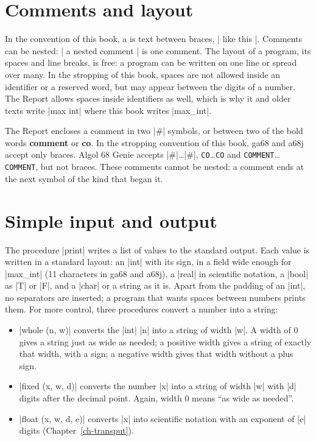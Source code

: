 \section{Comments and layout}\label{sec-comments}

In the convention of this book, a  is text between
braces, \code|{ like this }|. Comments can be nested: \code|{ a { nested } comment }| is one comment. The
layout of a program, its spaces and line breaks, is free: a program can be
written on one line or spread over many. In the stropping of this book,
spaces are not allowed inside an identifier or a reserved word, but may
appear between the digits of a number. The Report allows spaces inside
identifiers as well, which is why it and older texts write
\code|max int| where this book writes \code|max_int|.

\begin{implnote}
The Report encloses a comment in two \code|#| symbols, or between two
of the bold words \textbf{comment} or \textbf{co}. In the stropping
convention of this book, ga68 and a68j accept only braces. Algol 68 Genie
accepts \code|#|\ldots\code|#|, \texttt{CO}\ldots\texttt{CO} and
\texttt{COMMENT}\ldots\texttt{COMMENT}, but not braces. These comments
cannot be nested: a comment ends at the next symbol of the kind that
began it.
\end{implnote}

\section{Simple input and output}\label{sec-io}

The procedure \code|print| writes a list of values to the standard
output. Each value is written in a standard layout: an \code|int| with
its sign, in a field wide enough for \code|max_int| (11 characters in ga68
and a68j), a \code|real| in scientific notation,
a \code|bool| as \code|T| or \code|F|, and a \code|char| or a string as
it is. Apart from the padding of an \code|int|, no separators are
inserted; a program that wants spaces between numbers prints them. For more control, three procedures convert a number
into a string:
\begin{itemize}
\item \code|whole (n, w)| converts the \code|int| \code|n| into a string
  of width \code|w|. A width of 0 gives a string just as wide as needed; a
  positive width gives a string of exactly that width, with a sign; a
  negative width gives that width without a plus sign.
\item \code|fixed (x, w, d)| converts the number \code|x| into a string of
  width \code|w| with \code|d| digits after the decimal point. Again,
  width 0 means ``as wide as needed''.
\item \code|float (x, w, d, e)| converts \code|x| into scientific
  notation with an exponent of \code|e| digits (Chapter~\ref{ch-transput}).
\end{itemize}

